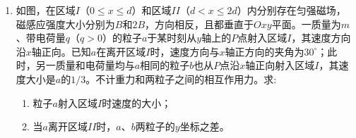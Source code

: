 \begin{enumerate}[leftmargin=0em]
{\begin{enumerate}
\end{enumerate}
}



\newpage
\item
{}
如图，在区域$ I $（$ 0 \leq x \leq d $）和区域$ II $（$ d<x \leq 2d $）内分别存在匀强磁场，磁感应强度大小分别为$ B $和$ 2B $，方向相反，且都垂直于$ Oxy $平面。一质量为$ m $、带电荷量$ q $（$ q > 0 $）的粒子$ a $于某时刻从$ y $轴上的$ P $点射入区域$ I $，其速度方向沿$ x $轴正向。已知$ a $在离开区域$ I $时，速度方向与$ x $轴正方向的夹角为$ 30 ^{ \circ } $；此时，另一质量和电荷量均与$ a $相同的粒子$ b $也从$ P $点沿$ x $轴正向射入区域$ I $，其速度大小是$ a $的$ 1/3 $。不计重力和两粒子之间的相互作用力。求:
\begin{enumerate}
\renewcommand{\labelenumi}{\arabic{enumi}.}
\item
粒子$ a $射入区域$ I $时速度的大小；
\item 
当$ a $离开区域$ II $时，$ a $、$ b $两粒子的$ y $坐标之差。



\end{enumerate}
\begin{figure}[h!]
\flushright

\end{figure}






\end{enumerate}
